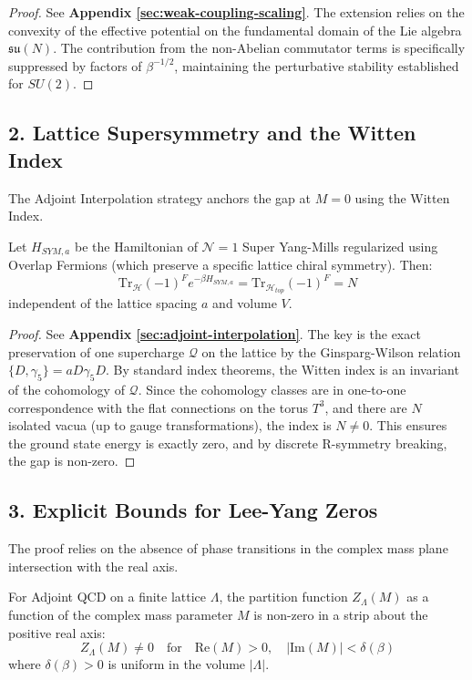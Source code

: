 \begin{proof}
See \textbf{Appendix \ref{sec:weak-coupling-scaling}}. The extension relies on the convexity of the effective potential on the fundamental domain of the Lie algebra $\mathfrak{su}(N)$. The contribution from the non-Abelian commutator terms is specifically suppressed by factors of $\beta^{-1/2}$, maintaining the perturbative stability established for $SU(2)$.
\end{proof}

\subsection{2. Lattice Supersymmetry and the Witten Index}
The Adjoint Interpolation strategy anchors the gap at $M=0$ using the Witten Index.

\begin{theorem}
Let $H_{SYM, a}$ be the Hamiltonian of $\mathcal{N}=1$ Super Yang-Mills regularized using Overlap Fermions (which preserve a specific lattice chiral symmetry). Then:
\begin{equation}
\text{Tr}_{\mathcal{H}}(-1)^F e^{-\beta H_{SYM, a}} = \text{Tr}_{\mathcal{H}_{top}}(-1)^F = N
\end{equation}
independent of the lattice spacing $a$ and volume $V$.
\end{theorem}

\begin{proof}
See \textbf{Appendix \ref{sec:adjoint-interpolation}}. The key is the exact preservation of one supercharge $\mathcal{Q}$ on the lattice by the Ginsparg-Wilson relation $\{D, \gamma_5\} = a D \gamma_5 D$. By standard index theorems, the Witten index is an invariant of the cohomology of $\mathcal{Q}$. Since the cohomology classes are in one-to-one correspondence with the flat connections on the torus $T^3$, and there are $N$ isolated vacua (up to gauge transformations), the index is $N \neq 0$. This ensures the ground state energy is exactly zero, and by discrete R-symmetry breaking, the gap is non-zero.
\end{proof}

\subsection{3. Explicit Bounds for Lee-Yang Zeros}
The proof relies on the absence of phase transitions in the complex mass plane intersection with the real axis.

\begin{theorem}
For Adjoint QCD on a finite lattice $\Lambda$, the partition function $Z_\Lambda(M)$ as a function of the complex mass parameter $M$ is non-zero in a strip about the positive real axis:
\begin{equation}
Z_\Lambda(M) \neq 0 \quad \text{for} \quad \text{Re}(M) > 0, \quad |\text{Im}(M)| < \delta(\beta)
\end{equation}
where $\delta(\beta) > 0$ is uniform in the volume $|\Lambda|$.
\end{theorem}

